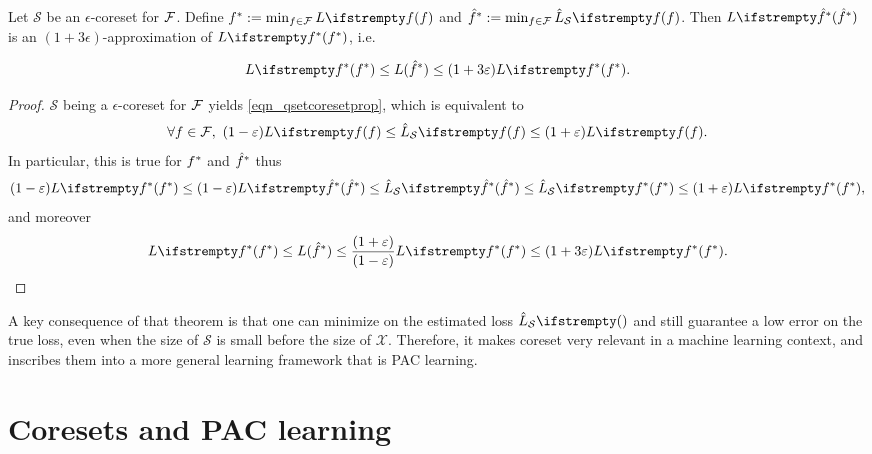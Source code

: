 \begin{tcolorbox}
    \begin{theorem}
        \label{thm_optcoreset}
        Let $\mathcal{S}$ be an $\epsilon$-coreset for $\mathcal{F}$. Define $\query^*:=\min_{\query \in \qset}\loss{\query}$ and $\hat \query^*:=\min_{\query \in \qset}\estloss{\mathcal{S}}{\query}$. Then $\loss{\hat\query^*} $ is an $(1+3\epsilon)$-approximation of $\loss{\query^*}$, i.e.
    
        \begin{equation*}
            \loss{\query^*} \le {L}( \hat\query^*)\leq (1+ 3 \epsilon)\loss{\query^*}.
        \end{equation*}
    \end{theorem}
\end{tcolorbox}
\begin{proof}
    $\mathcal{S}$ being a $\epsilon$-coreset for $\mathcal{F}$ yields \cref{eqn_qsetcoresetprop}, which is equivalent to 
    \begin{equation*}
        \forall \query \in \qset ,\ (1-\epsilon) \loss{\query} \le \estloss{\mathcal{S}}{\query} \le(1+\epsilon) \loss{\query}.
    \end{equation*}
    In particular, this is true for $f^*$ and $\hat {f}^*$ thus
    \begin{equation}
        (1-\epsilon) \loss{\query^*} \le(1-\epsilon) \loss{\hat\query^*} \le \estloss{\mathcal{S}}{\hat\query^*} \le \estloss{\mathcal{S}}{\query^*} \le(1+\epsilon) \loss{\query^*},
    \end{equation}
    and moreover
    \begin{equation*}
        \loss{\query^*} \le {L}( \hat\query^*) \le \frac{(1+\epsilon)}{(1-\epsilon) } \loss{\query^*} \leq (1+ 3 \epsilon)\loss{\query^*}.
        \end{equation*}
\end{proof}
A key consequence of that theorem is that one can minimize on the estimated loss $\estloss{\mathcal{S}}{}$ and still guarantee a low error on the true loss, even when the size of $\mathcal{S}$ is small before the size of $\mathcal{X}$. Therefore, it makes coreset very relevant in a machine learning context, and  inscribes them into a more general learning framework that is PAC learning.

\section{Coresets and PAC learning}
